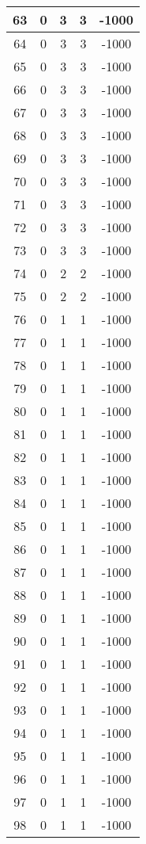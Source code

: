 \documentclass[letterpaper, 12pt]{article}
\begin{document}
\begin{longtable}{|c|c|c|c|c|}
\hline
63 & 0 & 3 & 3 & -1000 \\
\hline
64 & 0 & 3 & 3 & -1000 \\
\hline
65 & 0 & 3 & 3 & -1000 \\
\hline
66 & 0 & 3 & 3 & -1000 \\
\hline
67 & 0 & 3 & 3 & -1000 \\
\hline
68 & 0 & 3 & 3 & -1000 \\
\hline
69 & 0 & 3 & 3 & -1000 \\
\hline
70 & 0 & 3 & 3 & -1000 \\
\hline
71 & 0 & 3 & 3 & -1000 \\
\hline
72 & 0 & 3 & 3 & -1000 \\
\hline
73 & 0 & 3 & 3 & -1000 \\
\hline
74 & 0 & 2 & 2 & -1000 \\
\hline
75 & 0 & 2 & 2 & -1000 \\
\hline
76 & 0 & 1 & 1 & -1000 \\
\hline
77 & 0 & 1 & 1 & -1000 \\
\hline
78 & 0 & 1 & 1 & -1000 \\
\hline
79 & 0 & 1 & 1 & -1000 \\
\hline
80 & 0 & 1 & 1 & -1000 \\
\hline
81 & 0 & 1 & 1 & -1000 \\
\hline
82 & 0 & 1 & 1 & -1000 \\
\hline
83 & 0 & 1 & 1 & -1000 \\
\hline
84 & 0 & 1 & 1 & -1000 \\
\hline
85 & 0 & 1 & 1 & -1000 \\
\hline
86 & 0 & 1 & 1 & -1000 \\
\hline
87 & 0 & 1 & 1 & -1000 \\
\hline
88 & 0 & 1 & 1 & -1000 \\
\hline
89 & 0 & 1 & 1 & -1000 \\
\hline
90 & 0 & 1 & 1 & -1000 \\
\hline
91 & 0 & 1 & 1 & -1000 \\
\hline
92 & 0 & 1 & 1 & -1000 \\
\hline
93 & 0 & 1 & 1 & -1000 \\
\hline
94 & 0 & 1 & 1 & -1000 \\
\hline
95 & 0 & 1 & 1 & -1000 \\
\hline
96 & 0 & 1 & 1 & -1000 \\
\hline
97 & 0 & 1 & 1 & -1000 \\
\hline
98 & 0 & 1 & 1 & -1000 \\

\end{longtable}
\end{document}
